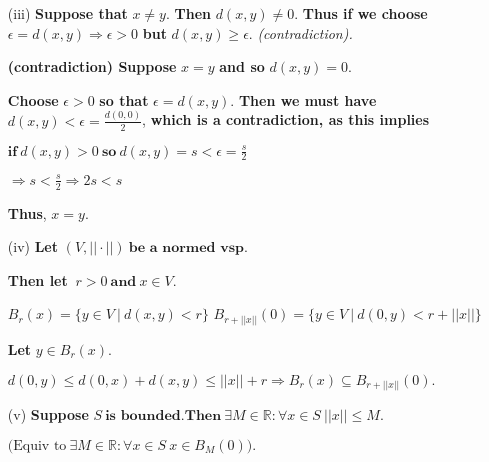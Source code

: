 \documentclass{article}
\theoremstyle{definition}
\numberwithin{equation}{section}
\begin{document}
\begin{enumerate}
    \item[(iii)] \textbf{Suppose that} \(x \neq y\). \textbf{Then} \(d(x,y) \neq 0\). \textbf{Thus if we choose} \(\epsilon = d(x,y) \Rightarrow \epsilon > 0 \) \textbf{but} \(d(x,y) \geq \epsilon\). \emph{(contradiction).}

    \textbf{(contradiction) Suppose} \(x = y\) \textbf{and so} \(d(x,y) = 0 \).

    \textbf{Choose} \(\epsilon > 0 \) \textbf{so that}  \(\epsilon = d(x,y) \). \textbf{Then we must have} \(d(x,y) < \epsilon = \frac{d(0,0)}{2}\), \textbf{which is a contradiction, as this implies}

    $ \textbf{if} \ d(x,y) > 0 \ \textbf{so} \ d(x,y) = s < \epsilon = \frac{s}{2}$

    $ \Rightarrow s < \frac{s}{2} \Rightarrow 2s < s$

    \textbf{Thus}, \( x = y \).

    \item[(iv)] \textbf{Let} \((V, || \cdot ||) \ \textbf{be a normed vsp.} \)

    \textbf{Then let} \( \ r > 0 \ \textbf{and} \ x \in V \).

    $ B_r(x) = \{y \in V \ | \ d(x,y) < r \} $
    $ B_{r + ||x||}(0) = \{y \in V \ | \ d(0,y) < r + ||x||\} $

    \textbf{Let} \( y \in B_r(x)\).

    $
        d(0,y) \leq d(0,x) + d(x,y)
        \leq ||x|| + r
        \Rightarrow B_r(x) \subseteq B_{r + ||x||}(0).
    $

    \item[(v)] \textbf{Suppose} \( S \ \textbf{is bounded.Then} \ \exists M \in \mathbb{R} : \forall x \in S \  ||x|| \leq M \).

    $
        \text{(Equiv to} \  \exists M \in \mathbb{R} : \forall x \in S \ x \in B_{M}(0)).
    $
\end{enumerate}
\end{document}
